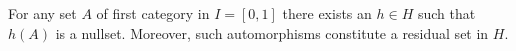 For any set $A$ of first category in $I = [0, 1]$ there exists an $h \in H$ such that $h(A)$ is a nullset. Moreover, such automorphisms constitute a residual set in $H$.
